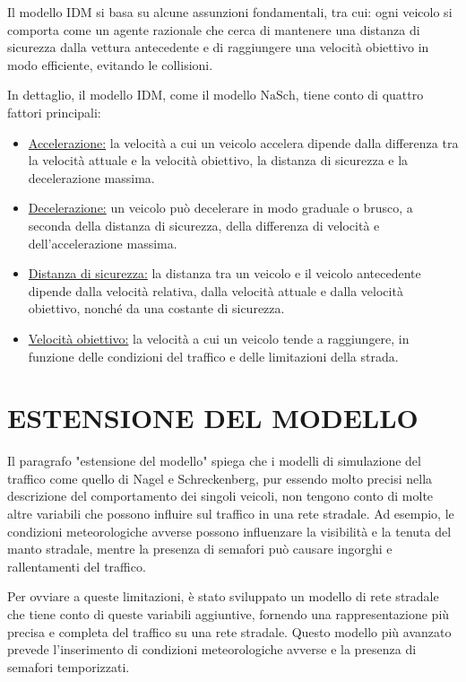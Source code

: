 \documentclass[11pt]{article}
\begin{document}
Il modello IDM si basa su alcune assunzioni fondamentali, tra cui: ogni veicolo si comporta come un agente razionale che cerca di mantenere una distanza di sicurezza dalla vettura antecedente e di raggiungere una velocità obiettivo in modo efficiente, evitando le collisioni. 

In dettaglio, il modello IDM, come il modello $\mathrm{NaSch}$, tiene conto di quattro fattori principali:
\begin{itemize}
\item \underline{Accelerazione:} la velocità a cui un veicolo accelera dipende dalla differenza tra la velocità attuale e la velocità obiettivo, la distanza di sicurezza e la decelerazione massima.

\item \underline{Decelerazione:} un veicolo può decelerare in modo graduale o brusco, a seconda della distanza di sicurezza, della differenza di velocità e dell'accelerazione massima.

\item \underline{Distanza di sicurezza:} la distanza tra un veicolo e il veicolo antecedente dipende dalla velocità relativa, dalla velocità attuale e dalla velocità obiettivo, nonché da una costante di sicurezza.

\item \underline{Velocità obiettivo:} la velocità a cui un veicolo tende a raggiungere, in funzione delle condizioni del traffico e delle limitazioni della strada.
\end{itemize}


\section{ESTENSIONE DEL MODELLO}
Il paragrafo "estensione del modello" spiega che i modelli di simulazione del traffico come quello di Nagel e Schreckenberg, pur essendo molto precisi nella descrizione del comportamento dei singoli veicoli, non tengono conto di molte altre variabili che possono influire sul traffico in una rete stradale. Ad esempio, le condizioni meteorologiche avverse possono influenzare la visibilità e la tenuta del manto stradale, mentre la presenza di semafori può causare ingorghi e rallentamenti del traffico.

Per ovviare a queste limitazioni, è stato sviluppato un modello di rete stradale che tiene conto di queste variabili aggiuntive, fornendo una rappresentazione più precisa e completa del traffico su una rete stradale. Questo modello più avanzato prevede l'inserimento di condizioni meteorologiche avverse e la presenza di semafori temporizzati.
\end{document}

